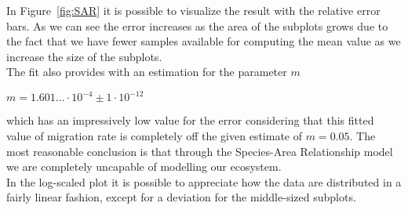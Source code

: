 \documentclass[a4paper,11pt]{article}
\begin{document}
In Figure~\ref{fig:SAR} it is possible to visualize the result with the relative error bars. As we can see the error increases as the area of the subplots grows due to the fact that we have fewer samples available for computing the mean value as we increase the size of the subplots.
\\
The fit also provides with an estimation for the parameter $m$
\begin{center}
    $m= 1.601...\cdot10^{-4} \pm1\cdot10^{-12}$
\end{center}
which has an impressively low value for the error considering that this fitted value of migration rate is completely off the given estimate of $m=0.05$. The most reasonable conclusion is that through the Species-Area Relationship model we are completely uncapable of modelling our ecosystem.
\\
In the log-scaled plot it is possible to appreciate how the data are distributed in a fairly linear fashion, except for a deviation for the middle-sized subplots.
\end{document}
